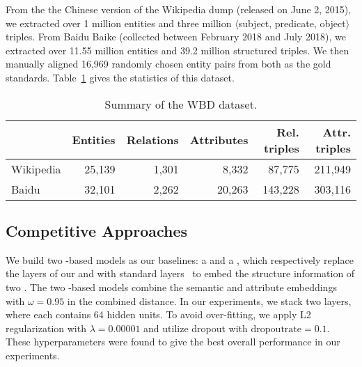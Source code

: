     From the the Chinese version
of the Wikipedia dump (released on June 2, 2015), we extracted over 1  million entities and three million $\langle$subject, predicate,
object$\rangle$ triples. From Baidu Baike (collected between February 2018 and July 2018), we extracted over 11.55 million entities and
39.2 million structured triples.
    We then manually aligned 16,969 randomly chosen entity pairs from both \KGs as the gold standards.
	Table~\ref{dataset} gives the statistics of this dataset. 
	




	\begin{table}
	\centering
	\scriptsize
	\begin{tabular}{l|rrrrr}
		\toprule
		&\bf  Entities &\bf  Relations &\bf  Attributes &\bf  Rel. triples &\bf  Attr. triples \\
		\midrule
		Wikipedia & 25,139 & 1,301 & 8,332 & 87,775 & 211,949 \\
		Baidu & 32,101 & 2,262 & 20,263 & 143,228 & 303,116 \\
		\bottomrule
	\end{tabular}
	\caption{Summary of the WBD dataset.}
	\label{dataset}
\end{table}


	\subsection{Competitive Approaches}
	We build two \GCN-based models as our baselines: a \GCN and a \HGCN, which respectively replace the \RGCN layers of our \RGCN and \HRGCN with standard \GCN layers~\cite{Kipf2016Semi} to embed the structure information of two \KGs.
	The two \GCN-based models combine the semantic and attribute embeddings with $\omega=0.95$ in the combined distance.
	In our experiments, we stack two \GCN layers, where each \GCN contains 64 hidden units.
	To avoid over-fitting, we apply L2 regularization with $\lambda=0.00001$ and utilize dropout with $\mathrm{dropout rate}=0.1$.
	These hyperparameters were found to give the best overall performance in our experiments. 



